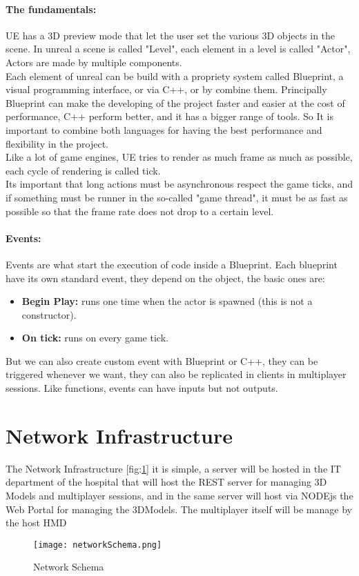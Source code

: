 \paragraph{The fundamentals:}
\ac{UE} has a 3D preview mode that let the user set the various 3D objects in the scene. 
In unreal a scene is called "Level", each element in a level is called "Actor", Actors are made by multiple components.\\
Each element of unreal can be build with a propriety system called Blueprint, a visual programming interface, or via C++, or by combine them.
Principally Blueprint can make the developing of the project faster and easier at the cost of performance, C++ perform better, and it has a bigger range of tools.
So It is important to combine both languages for having the best performance and flexibility in the project.\\
Like a lot of game engines, \ac{UE} tries to render as much frame as much as possible, each cycle of rendering is called tick.\\
Its important that long actions must be asynchronous respect the game ticks, and if something must be runner in the so-called "game thread", it must be as fast as possible so that the frame rate does not drop to a certain level.

\paragraph{Events:}
Events are what start the execution of code inside a Blueprint. Each blueprint have its own standard event, they depend on the object, the basic ones are:
\begin{itemize}
  \item \textbf{Begin Play:} runs one time when the actor is spawned (this is not a constructor).
  \item \textbf{On tick:} runs on every game tick.
\end{itemize}
\noindent
But we can also create custom event with Blueprint or C++, they can be triggered whenever we want, they can also be replicated in clients in multiplayer sessions. 
Like functions, events can have inputs but not outputs.

\section{Network Infrastructure}
\noindent
The Network Infrastructure [fig:\ref{fig:NetworkSchema}] it is simple, a server will be hosted in the IT department of the hospital that will host the REST server for managing 3D Models and multiplayer sessions,
and in the same server will host via NODEjs the Web Portal for managing the 3DModels.
The multiplayer itself will be manage by the host \ac{HMD}

\begin{figure}[h]
  \centering
  \texttt{[image: networkSchema.png]}
  \caption{Network Schema}
  \label{fig:NetworkSchema}
\end{figure}

